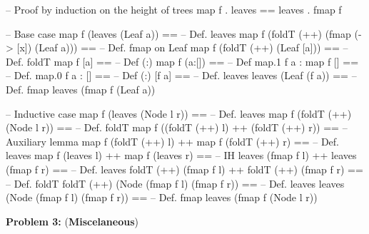 \documentclass[a4,11pt]{article}
\begin{document}
\begin{enumerate}
  \begin{code}
  -- Proof by induction on the height of trees
  map f . leaves == leaves . fmap f

  -- Base case
  map f (leaves (Leaf a))                         ==
  -- Def. leaves
  map f (foldT (++) (fmap (\x -> [x]) (Leaf a)))  ==
  -- Def. fmap on Leaf
  map f (foldT (++) (Leaf [a]))                   ==
  -- Def. foldT
  map f [a]                                       ==
  -- Def (:)
  map f (a:[])                                    ==
  -- Def map.1
  f a : map f []                                  ==
  -- Def. map.0
  f a : []                                        ==
  -- Def (:)
  [f a]                                           ==
  -- Def. leaves
  leaves (Leaf (f a))                             ==
  -- Def. fmap
  leaves (fmap f (Leaf a))

  -- Inductive case
  map f (leaves (Node l r))                       ==
  -- Def. leaves
  map f (foldT (++) (Node l r))                   ==
  -- Def. foldT
  map f ((foldT (++) l) ++ (foldT (++) r))        ==
  -- Auxiliary lemma
  map f (foldT (++) l) ++ map f (foldT (++) r)    ==
  -- Def. leaves
  map f (leaves l) ++ map f (leaves r)            ==
  -- IH
  leaves (fmap f l) ++ leaves (fmap f r)          ==
  -- Def. leaves
  foldT (++) (fmap f l) ++ foldT (++) (fmap f r)  ==
  -- Def. foldT
  foldT (++) (Node (fmap f l) (fmap f r))         ==
  -- Def. leaves
  leaves (Node (fmap f l) (fmap f r))             ==
  -- Def. fmap
  leaves (fmap f (Node l r))
  \end{code}
  \fi

\end{enumerate}

\newpage
\noindent
\textbf{Problem 3:} (\textbf{Miscelaneous})
\end{document}
